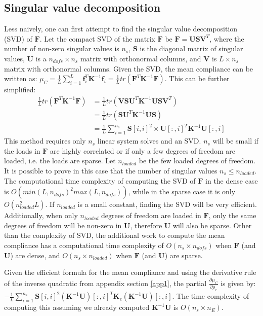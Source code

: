   \subsection{Singular value decomposition}

    Less naively, one can first attempt to find the singular value decomposition (SVD) of $\bm{F}$. Let the compact SVD of the matrix $\bm{F}$ be $\bm{F} = \bm{U} \bm{S} \bm{V}^T$, where the number of non-zero singular values is $n_s$, $\bm{S}$ is the diagonal matrix of singular values, $\bm{U}$ is a $n_{dofs} \times n_s$ matrix with orthonormal columns, and $\bm{V}$ is $L \times n_s$ matrix with orthonormal columns. Given the SVD, the mean compliance can be written as: $\mu_C = \frac{1}{L} \sum_{i=1}^L \bm{f}_i^T \bm{K}^{-1} \bm{f}_i = \frac{1}{L} tr(\bm{F}^T \bm{K}^{-1} \bm{F})$. This can be further simplified:
    \begin{align}
     \frac{1}{L} tr(\bm{F}^T \bm{K}^{-1} \bm{F}) & = \frac{1}{L} tr(\bm{V} \bm{S} \bm{U}^T \bm{K}^{-1} \bm{U} \bm{S} \bm{V}^T) \\
     & = \frac{1}{L} tr(\bm{S} \bm{U}^T \bm{K}^{-1} \bm{U} \bm{S}) \\
     & = \frac{1}{L} \sum_{i=1}^{n_s} \bm{S}[i,i]^2 \times \bm{U}[:,i]^T \bm{K}^{-1} \bm{U}[:,i]
    \end{align}
    This method requires only $n_s$ linear system solves and an SVD. $n_s$ will be small if the loads in $\bm{F}$ are highly correlated or if only a few degrees of freedom are loaded, i.e. the loads are sparse. Let $n_{loaded}$ be the few loaded degrees of freedom. It is possible to prove in this case that the number of singular values $n_s \leq n_{loaded}$. The computational time complexity of computing the SVD of $\bm{F}$ in the dense case is $O(min(L, n_{dofs})^2 max(L, n_{dofs}))$, while in the sparse case it is only $O(n_{loaded}^2 L)$. If $n_{loaded}$ is a small constant, finding the SVD will be very efficient. Additionally, when only $n_{loaded}$ degrees of freedom are loaded in $\bm{F}$, only the same degrees of freedom will be non-zero in $\bm{U}$, therefore $\bm{U}$ will also be sparse. Other than the complexity of SVD, the additional work to compute the mean compliance has a computational time complexity of $O(n_s \times n_{dofs})$ when $\bm{F}$ (and $\bm{U}$) are dense, and $O(n_s \times n_{loaded})$ when $\bm{F}$ (and $\bm{U}$) are sparse.

    Given the efficient formula for the mean compliance and using the derivative rule of the inverse quadratic from appendix section \ref{app1}, the partial $\frac{\partial \mu_C}{\partial \rho_e}$ is given by: \\ $-\frac{1}{L} \sum_{i=1}^{n_s} \bm{S}[i,i]^2 (\bm{K}^{-1}\bm{U})[:,i]^T \bm{K}_e (\bm{K}^{-1}\bm{U})[:,i]$. The time complexity of computing this assuming we already computed $\bm{K}^{-1} \bm{U}$ is $O(n_s \times n_E)$. 

